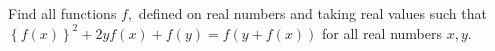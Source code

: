 Find all functions $f,$ defined on real numbers and taking real values such that $\left\{f(x)\right\}^2+2yf(x)+f(y)=f(y+f(x))$ for all real numbers $x,y.$